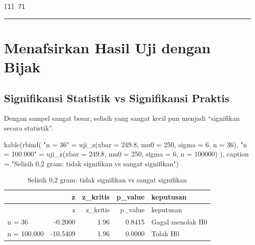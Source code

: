 \documentclass[
  indonesian,
  letterpaper,
]{book}
\newenvironment{Shaded}{\begin{snugshade}}{\end{snugshade}}
\newcommand{\AttributeTok}[1]{\textcolor[rgb]{0.40,0.45,0.13}{#1}}
\newcommand{\DecValTok}[1]{\textcolor[rgb]{0.68,0.00,0.00}{#1}}
\newcommand{\FloatTok}[1]{\textcolor[rgb]{0.68,0.00,0.00}{#1}}
\newcommand{\FunctionTok}[1]{\textcolor[rgb]{0.28,0.35,0.67}{#1}}
\newcommand{\NormalTok}[1]{\textcolor[rgb]{0.00,0.23,0.31}{#1}}
\newcommand{\OtherTok}[1]{\textcolor[rgb]{0.00,0.23,0.31}{#1}}
\newcommand{\StringTok}[1]{\textcolor[rgb]{0.13,0.47,0.30}{#1}}
\begin{document}
\begin{verbatim}
[1] 71
\end{verbatim}

\begin{center}\rule{0.5\linewidth}{0.5pt}\end{center}


\chapter{Menafsirkan Hasil Uji dengan
Bijak}\label{menafsirkan-hasil-uji-dengan-bijak}

\section{Signifikansi Statistik vs Signifikansi
Praktis}\label{signifikansi-statistik-vs-signifikansi-praktis}

Dengan sampel sangat besar, selisih yang sangat kecil pun menjadi
``signifikan secara statistik''.

\begin{Shaded}
\begin{Highlighting}[]
\FunctionTok{kable}\NormalTok{(}\FunctionTok{rbind}\NormalTok{(}
  \StringTok{"n = 36"}      \OtherTok{=} \FunctionTok{uji\_z}\NormalTok{(}\AttributeTok{xbar =} \FloatTok{249.8}\NormalTok{, }\AttributeTok{mu0 =} \DecValTok{250}\NormalTok{, }\AttributeTok{sigma =} \DecValTok{6}\NormalTok{, }\AttributeTok{n =} \DecValTok{36}\NormalTok{),}
  \StringTok{"n = 100.000"} \OtherTok{=} \FunctionTok{uji\_z}\NormalTok{(}\AttributeTok{xbar =} \FloatTok{249.8}\NormalTok{, }\AttributeTok{mu0 =} \DecValTok{250}\NormalTok{, }\AttributeTok{sigma =} \DecValTok{6}\NormalTok{, }\AttributeTok{n =} \DecValTok{100000}\NormalTok{)}
\NormalTok{), }\AttributeTok{caption =} \StringTok{"Selisih 0,2 gram: tidak signifikan vs sangat signifikan"}\NormalTok{)}
\end{Highlighting}
\end{Shaded}

\begin{longtable}[]{@{}lrrrl@{}}
\caption{Selisih 0,2 gram: tidak signifikan vs sangat
signifikan}\tabularnewline
\toprule\noalign{}
& z & z\_kritis & p\_value & keputusan \\
\midrule\noalign{}
\endfirsthead
\toprule\noalign{}
& z & z\_kritis & p\_value & keputusan \\
\midrule\noalign{}
\endhead
\bottomrule\noalign{}
\endlastfoot
n = 36 & -0.2000 & 1.96 & 0.8415 & Gagal menolak H0 \\
n = 100.000 & -10.5409 & 1.96 & 0.0000 & Tolak H0 \\
\end{longtable}
\end{document}
